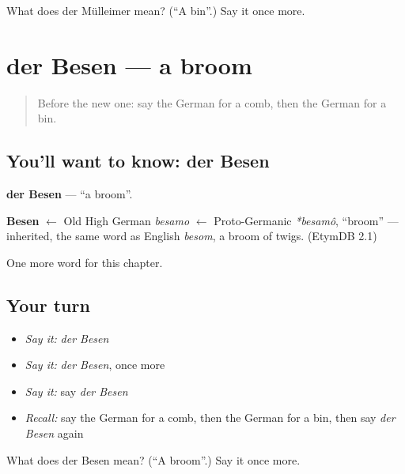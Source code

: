 \begin{tcolorbox}[breakable,colback=teal!4,colframe=teal!35!black,title={Before you move on}]
What does der Mülleimer mean? (\textquotedblleft{}A bin\textquotedblright{}.) Say it once more.
\end{tcolorbox}
\section[der Besen]{der Besen — a broom}

\label{lesson:GE-C115-besen}



\begin{quote}
Before the new one: say the German for a comb, then the German for a bin.
\end{quote}

\subsection*{You'll want to know: der Besen}
\textbf{der Besen} — \textquotedblleft{}a broom\textquotedblright{}.

\begin{cousinweb}
\textbf{Besen} $\leftarrow$ Old High German \emph{besamo} $\leftarrow$ Proto-Germanic \emph{*besamô}, \textquotedblleft{}broom\textquotedblright{} — inherited, the same word as English \emph{besom}, a broom of twigs. (EtymDB 2.1)
\end{cousinweb}

\begin{grammarlens}[title={What you've built}]
One more word for this chapter.
\end{grammarlens}

\subsection*{Your turn}
\begin{itemize}
\raggedright
  \item \emph{Say it:} \emph{der Besen}
  \item \emph{Say it:} \emph{der Besen}, once more
  \item \emph{Say it:} say \emph{der Besen}
  \item \emph{Recall:} say the German for a comb, then the German for a bin, then say \emph{der Besen} again
\end{itemize}

\begin{tcolorbox}[breakable,colback=teal!4,colframe=teal!35!black,title={Before you move on}]
What does der Besen mean? (\textquotedblleft{}A broom\textquotedblright{}.) Say it once more.
\end{tcolorbox}
